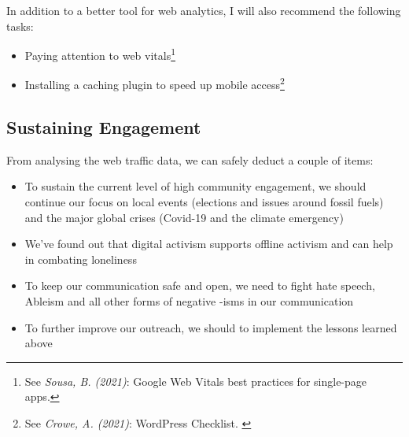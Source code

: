 In addition to a better tool for web analytics, I will also recommend the following tasks:

\begin{itemize}
 \item Paying attention to web vitals\footnote{See \textit{Sousa, B. (2021)}: Google Web Vitals best practices for single-page apps.\cite{webVitals}}
 \item Installing a caching plugin to speed up mobile access\footnote{See \textit{Crowe, A. (2021)}: WordPress Checklist. \cite{wpCachePlugin}}
\end{itemize}

\subsection{Sustaining Engagement}

From analysing the web traffic data, we can safely deduct a couple of items:

\begin{itemize}
 \item To sustain the current level of high community engagement, we should continue our focus on local events (elections and issues around fossil fuels) and the major global crises (Covid-19 and the climate emergency)
 \item We've found out that digital activism supports offline activism and can help in combating loneliness
 \item To keep our communication safe and open, we need to fight hate speech, Ableism and all other forms of negative -isms in our communication
 \item To further improve our outreach, we should to implement the lessons learned above
\end{itemize}
